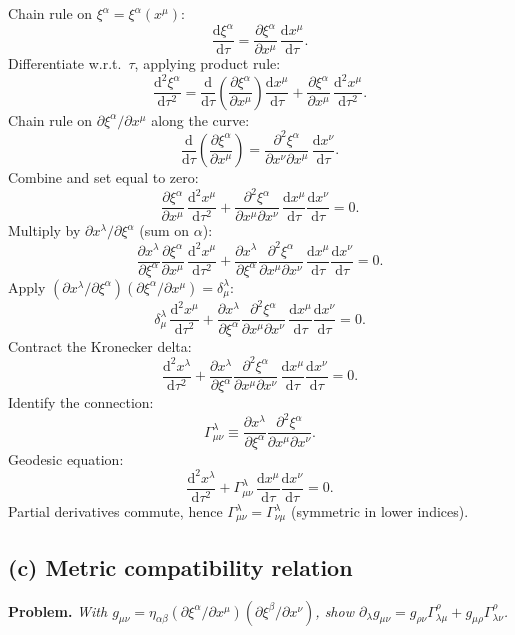 \documentclass[11pt]{article}
\newcommand{\de}{\mathrm{d}}
\newcommand{\pd}[2]{\frac{\partial #1}{\partial #2}}
\begin{document}
Chain rule on $\xi^\alpha = \xi^\alpha(x^\mu)$:
\[
\frac{\de \xi^\alpha}{\de\tau} = \pd{\xi^\alpha}{x^\mu}\,\frac{\de x^\mu}{\de\tau}.
\]
Differentiate w.r.t.\ $\tau$, applying product rule:
\[
\frac{\de^2\xi^\alpha}{\de\tau^2} = \frac{\de}{\de\tau}\!\left(\pd{\xi^\alpha}{x^\mu}\right)\!\frac{\de x^\mu}{\de\tau} + \pd{\xi^\alpha}{x^\mu}\,\frac{\de^2 x^\mu}{\de\tau^2}.
\]
Chain rule on $\partial\xi^\alpha/\partial x^\mu$ along the curve:
\[
\frac{\de}{\de\tau}\!\left(\pd{\xi^\alpha}{x^\mu}\right) = \frac{\partial^2\xi^\alpha}{\partial x^\nu\partial x^\mu}\,\frac{\de x^\nu}{\de\tau}.
\]
Combine and set equal to zero:
\[
\pd{\xi^\alpha}{x^\mu}\,\frac{\de^2 x^\mu}{\de\tau^2} + \frac{\partial^2\xi^\alpha}{\partial x^\mu\partial x^\nu}\,\frac{\de x^\mu}{\de\tau}\frac{\de x^\nu}{\de\tau}=0.
\]
Multiply by $\partial x^\lambda/\partial\xi^\alpha$ (sum on $\alpha$):
\[
\pd{x^\lambda}{\xi^\alpha}\pd{\xi^\alpha}{x^\mu}\,\frac{\de^2 x^\mu}{\de\tau^2} + \pd{x^\lambda}{\xi^\alpha}\frac{\partial^2\xi^\alpha}{\partial x^\mu\partial x^\nu}\,\frac{\de x^\mu}{\de\tau}\frac{\de x^\nu}{\de\tau} = 0.
\]
Apply $(\partial x^\lambda/\partial\xi^\alpha)(\partial\xi^\alpha/\partial x^\mu)=\delta^\lambda_\mu$:
\[
\delta^\lambda_\mu\,\frac{\de^2 x^\mu}{\de\tau^2} + \pd{x^\lambda}{\xi^\alpha}\frac{\partial^2\xi^\alpha}{\partial x^\mu\partial x^\nu}\,\frac{\de x^\mu}{\de\tau}\frac{\de x^\nu}{\de\tau} = 0.
\]
Contract the Kronecker delta:
\[
\frac{\de^2 x^\lambda}{\de\tau^2} + \pd{x^\lambda}{\xi^\alpha}\frac{\partial^2\xi^\alpha}{\partial x^\mu\partial x^\nu}\,\frac{\de x^\mu}{\de\tau}\frac{\de x^\nu}{\de\tau} = 0.
\]
Identify the connection:
\[
\Gamma^\lambda_{\mu\nu} \equiv \pd{x^\lambda}{\xi^\alpha}\frac{\partial^2\xi^\alpha}{\partial x^\mu\partial x^\nu}.
\]
Geodesic equation:
\[
\boxed{\;\frac{\de^2 x^\lambda}{\de\tau^2} + \Gamma^\lambda_{\mu\nu}\,\frac{\de x^\mu}{\de\tau}\frac{\de x^\nu}{\de\tau} = 0.\;}
\]
Partial derivatives commute, hence $\Gamma^\lambda_{\mu\nu} = \Gamma^\lambda_{\nu\mu}$ (symmetric in lower indices).

\subsection*{(c) Metric compatibility relation}

\textbf{Problem.} \emph{With $g_{\mu\nu}=\eta_{\alpha\beta}(\partial\xi^\alpha/\partial x^\mu)(\partial\xi^\beta/\partial x^\nu)$, show $\partial_\lambda g_{\mu\nu} = g_{\rho\nu}\Gamma^\rho_{\lambda\mu} + g_{\mu\rho}\Gamma^\rho_{\lambda\nu}$.}
\end{document}
